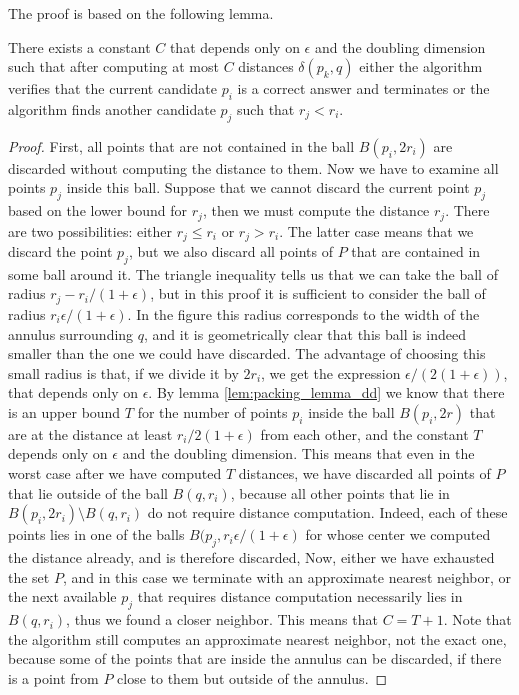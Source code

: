 \documentclass[a4paper,USenglish]{socg-lipics-v2018}
\newcommand{\eps}{\epsilon}
\newcommand{\dist}{\delta}
\begin{document}
The proof is based on the following lemma.
\begin{lemma}
    There exists a constant $C$ that depends only on $\eps$ and the doubling dimension
    such that after computing at most $C$ distances $\dist(p_k, q)$
    either the algorithm verifies that the current candidate $p_i$ is a correct answer and terminates
    or the algorithm finds another candidate $p_j$ such that $r_j < r_i$.
\end{lemma}
\begin{proof}
    First, all points that are not contained in the ball $B(p_i, 2r_i)$
    are discarded without computing the distance to them.
    Now we have to examine all points $p_j$ inside this ball. 
    Suppose that we cannot discard the current point $p_j$ based
    on the lower bound for $r_j$, then we must compute the distance $r_j$.
    There are two possibilities: either $r_j \leq r_i$ or $r_j > r_i$.
    The latter case means that we discard the point $p_j$,
    but we also discard all points of $P$ that are contained in some ball around it.
    The triangle inequality tells us that we can take the ball of radius $r_j - r_i / (1 + \eps)$,
    but in this proof it is sufficient to consider the ball of radius $r_i \eps / (1 + \eps)$.
    In the figure this radius corresponds to the width of the annulus surrounding $q$,
    and it is  geometrically clear that this ball is indeed smaller than the one we could have discarded.
    The advantage of choosing this small radius is that, if we divide it by $2r_i$, we 
    get the expression $\eps / (2(1 + \eps))$, that depends only on $\eps$.
    By lemma \ref{lem:packing_lemma_dd} we know that there is an upper bound $T$ for the number of points
    $p_i$ inside the ball $B(p_i, 2r)$ that are at the distance at least $r_i / 2 ( 1 + \eps)$
    from each other, and the constant $T$ depends only on $\eps$ and the doubling dimension.
    This means that even in the worst case after we have computed $T$ distances, we have discarded all
    points of $P$ that lie outside of the ball $B(q, r_i)$, because all other points that lie in $B(p_i, 2r_i) \setminus B(q, r_i)$ 
    do not require distance computation. Indeed, each of these points lies in
    one of the balls $B(p_j, r_i \eps / (1 + \eps)$ for whose center we computed the distance already,
    and is therefore discarded, Now, either we have exhausted the set $P$, and in this
    case we terminate with an approximate nearest neighbor, or the next available $p_j$ that requires
    distance computation necessarily lies in $B(q, r_i)$, thus we found a closer neighbor. This means that $C = T+1$.
    Note that the algorithm still computes an approximate nearest neighbor, not the exact one, 
    because some of the points that are inside the annulus can be discarded, 
    if there is a point from $P$ close to them but outside of the annulus. 
\end{proof}
\end{document}
